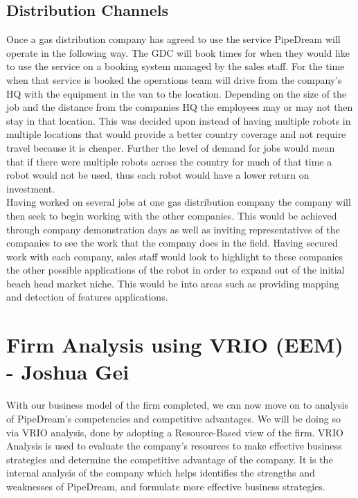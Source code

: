 \documentclass[11pt]{article}		%
\begin{document}
        \subsection{Distribution Channels}
	        
	       Once a gas distribution company has agreed to use the service PipeDream will operate in the following way.
	       The GDC will book times for when they would like to use the service on a booking system  managed by the sales staff. For the time when that service is booked the operations team will drive from the company’s HQ with the equipment in the van to the location. Depending on the size of the job and the distance from the companies HQ the employees may or may not then stay in that location. This was decided upon instead of having multiple robots in multiple locations that would provide a better country coverage and not require travel because it is cheaper. Further the level of demand for jobs would mean that if there were multiple robots across the country for much of that time a robot would not be used, thus each robot would have a lower return on investment.
	       \\
            Having worked on several jobs at one gas distribution company the company will then seek to begin working with the other companies. This would be achieved through company demonstration days as well as inviting representatives of the companies to see the work that the company does in the field. Having secured work with each company, sales staff would look to highlight to these companies the other possible applications of the robot in order to expand out of the initial beach head market niche. This would be into areas such as providing mapping and detection of features applications.
            
	\section[Firm Analysis using VRIO - EEM]{Firm Analysis using VRIO (EEM) - Joshua Gei}
	With our business model of the firm completed, we can now move on to analysis of PipeDream's competencies and competitive advantages. We will be doing so via VRIO analysis, done by adopting a Resource-Based view of the firm. VRIO Analysis is used to evaluate the company’s resources to make effective business strategies and determine the competitive advantage of the company. It is the internal analysis of the company which
    helps identifies the strengths and weaknesses of PipeDream, and formulate more effective business strategies. 
	
\end{document}
